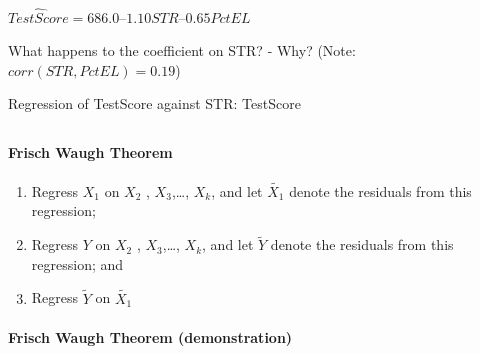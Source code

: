 \documentclass[
  letterpaper,
  DIV=11,
  numbers=noendperiod]{scrartcl}
\let\oldparagraph\paragraph
\renewcommand{\paragraph}[1]{\oldparagraph{#1}\mbox{}}
\newenvironment{Shaded}{\begin{snugshade}}{\end{snugshade}}
\newcommand{\AttributeTok}[1]{\textcolor[rgb]{0.56,0.74,0.73}{#1}}
\newcommand{\FunctionTok}[1]{\textcolor[rgb]{0.53,0.75,0.82}{#1}}
\newcommand{\NormalTok}[1]{\textcolor[rgb]{0.85,0.87,0.91}{#1}}
\newcommand{\OtherTok}[1]{\textcolor[rgb]{0.56,0.74,0.73}{#1}}
\newcommand{\SpecialCharTok}[1]{\textcolor[rgb]{0.92,0.80,0.55}{#1}}
\providecommand{\tightlist}{%
  \setlength{\itemsep}{0pt}\setlength{\parskip}{0pt}}\usepackage{longtable,booktabs,array}
\begin{document}
\hypertarget{section-10}{%
\subsection{}\label{section-10}}

\(\widehat{TestScore} = 686.0 – 1.10STR – 0.65PctEL\)

What happens to the coefficient on STR? - Why? (Note:
\(corr(STR, PctEL) = 0.19\))

Regression of TestScore against STR: TestScore

\hypertarget{section-11}{%
\subsection{}\label{section-11}}

\hypertarget{frisch-waugh-theorem}{%
\paragraph{Frisch Waugh Theorem}\label{frisch-waugh-theorem}}

\begin{enumerate}
\def\labelenumi{\arabic{enumi}.}
\tightlist
\item
  Regress \(X_1\) on \(X_2\) , \(X_3\),\ldots, \(X_k\), and let
  \(\tilde{X_1}\) denote the residuals from this regression;
\item
  Regress \(Y\) on \(X_2\) , \(X_3\),\ldots, \(X_k\), and let
  \(\tilde{Y}\) denote the residuals from this regression; and
\item
  Regress \(\tilde{Y}\) on \(\tilde{X_1}\)
\end{enumerate}

\hypertarget{frisch-waugh-theorem-demonstration}{%
\paragraph{Frisch Waugh Theorem
(demonstration)}\label{frisch-waugh-theorem-demonstration}}

\begin{Shaded}
\end{Shaded}
\end{document}
